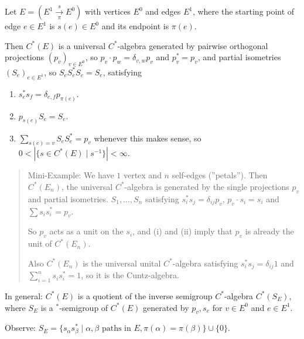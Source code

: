 \documentclass[a4paper]{article}
\begin{document}
\begin{example}
	Let $E = (E^1 \xrightarrow[\pi]{s} E^0)$ with vertices $E^0$ and edges $E^1$, where the starting point of edge $e \in E^1$ is $s(e) \in E^0$ and its endpoint is $\pi(e)$.

	Then $C^*(E)$ is a universal $C^*$-algebra generated by pairwise orthogonal projections $(p_v)_{v \in E^0}$, so $p_v \cdot p_w = \delta_{v,w} p_v$ and $p_v^* = p_v$, and partial isometries $(S_e)_{e \in E^1}$, so $S_e S_e^* S_e = S_e$, satisfying
	\begin{enumerate}
		\item $s_e^* s_f = \delta_{e,f} p_{\pi(e)}$.
		\item $p_{s(e)} S_e = S_e$.
		\item $\sum_{s(e) = v} S_e S_e^* = p_v$ whenever this makes sense, so $0 < |\{s \in C^*(E) \mid s^{-1} \}| < \infty$.
	\end{enumerate}

	\begin{quote}
		Mini-Example: We have $1$ vertex and $n$ self-edges (''petals'').
		Then $C^*(E_n)$, the universal $C^*$-algebra is generated by the single projections $p_v$ and partial isometries. $S_1, \dots, S_n$ satisfying $s_i^* s_j = \delta_{ij} p_v$, $p_v \cdot s_i = s_i$ and $\sum s_i s_i^* = p_v$.

		So $p_v$ acts as a unit on the $s_i$, and (i) and (ii) imply that $p_v$ is already the unit of $C^*(E_n)$.

		Also $C^*(E_n)$ is the universal unital $C^*$-algebra satisfying  $s_i^* s_j = \delta_{ij} 1$ and $\sum_{i = 1}^{n} s_i s_i^* = 1$, so it is the Cuntz-algebra.
	\end{quote}

	In general:
	$C^*(E)$ is a quotient of the inverse semigroup $C^*$-algebra $C^*(S_E)$, where $S_E $ is a $^*$-semigroup of $C^*(E)$ generated by $p_v, s_e$ for $v \in E^0$ and $e \in E^1$.

	Observe: $S_E = \{ s_\alpha s_\beta^* \mid \alpha, \beta \text{ paths in } E, \pi(\alpha) = \pi(\beta) \} \cup \{0\} $.
\end{example}
\end{document}
